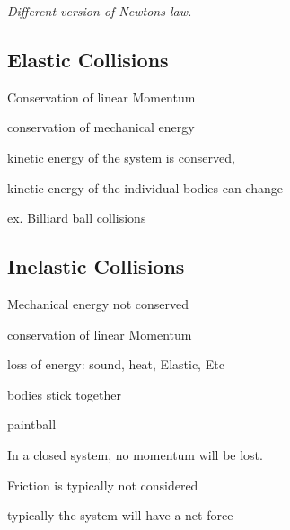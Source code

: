\documentclass{article}
\begin{document}
    \begin{center}
        \textit{Different version of Newtons law.}
    \end{center}
    
    \begin{center}
        \large
    \end{center}

    
    \hrulefill
    \subsection{Elastic Collisions}
        \begin{list}{-}{}
            \item Conservation of linear Momentum
            \item conservation of mechanical energy
            \item kinetic energy of the system is conserved, 
            \item kinetic energy of the individual bodies can change
            \item ex. Billiard ball collisions
        \end{list}
    \subsection{Inelastic Collisions}
        \begin{list}{-}{}
            \item Mechanical energy not conserved 
            \item conservation of linear Momentum
            \item loss of energy: sound, heat, Elastic, Etc 
            \item bodies stick together 
            \item paintball
        \end{list}

    In a closed system, no momentum will be  lost. 

    \begin{list}{-}{}
        \item Friction is typically not considered 
        \item typically the system will have a net force
    \end{list}
    \pagebreak

    
\end{document}
